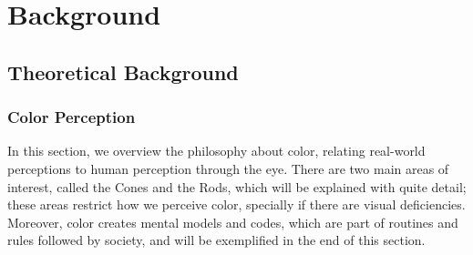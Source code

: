 
\chapter{Background}
\label{chapter:background}

\section{Theoretical Background}
\label{sec:theory_background}

\subsection{Color Perception}
\label{subsec:colorperception}
%
In this section, we overview the philosophy about color, relating real-world perceptions to human perception
through the eye. There are two main areas of interest, called the Cones and the Rods, which will be explained
with quite detail; these areas restrict how we perceive color, specially if there are visual deficiencies.
Moreover, color creates mental models and codes, which are part of routines and rules followed by society, and will be exemplified in the end of this section.
%
